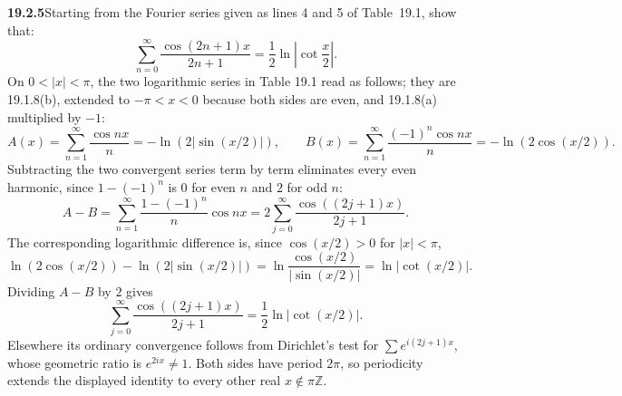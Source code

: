 \par\bigskip
\noindent\textbf{19.2.5}\quad Starting from the Fourier series
given as lines 4 and 5 of Table~19.1, show that:
\[
\sum_{n=0}^{\infty}\frac{\cos(2n+1)x}{2n+1}
=\frac{1}{2}\ln\left|\cot\frac{x}{2}\right|.
\]
\solution
On $0<|x|<\pi$, the two logarithmic series in Table 19.1 read as
follows; they are 19.1.8(b), extended to $-\pi<x<0$ because both sides
are even, and 19.1.8(a) multiplied by $-1$:
\[
A(x)=\sum_{n=1}^{\infty}\frac{\cos nx}{n}
=-\ln(2|\sin(x/2)|),
\qquad
B(x)=\sum_{n=1}^{\infty}\frac{(-1)^n\cos nx}{n}
=-\ln(2\cos(x/2)).
\]
Subtracting the two convergent series term by term eliminates every even
harmonic, since $1-(-1)^n$ is $0$ for even $n$ and $2$ for odd $n$:
\[
A-B=\sum_{n=1}^{\infty}\frac{1-(-1)^n}{n}\cos nx
=2\sum_{j=0}^{\infty}\frac{\cos((2j+1)x)}{2j+1}.
\]
The corresponding logarithmic difference is, since $\cos(x/2)>0$ for
$|x|<\pi$,
\[
\ln(2\cos(x/2))-\ln(2|\sin(x/2)|)
=\ln\frac{\cos(x/2)}{|\sin(x/2)|}
=\ln|\cot(x/2)|.
\]
Dividing $A-B$ by $2$ gives
\[
\boxed{\sum_{j=0}^{\infty}\frac{\cos((2j+1)x)}{2j+1}
=\frac12\ln|\cot(x/2)|.}
\]
Elsewhere its ordinary convergence follows from Dirichlet's test for
$\sum e^{i(2j+1)x}$, whose geometric ratio is $e^{2ix}\ne1$.
Both sides have period $2\pi$, so periodicity extends the displayed
identity to every other real $x\notin\pi\mathbb Z$.

